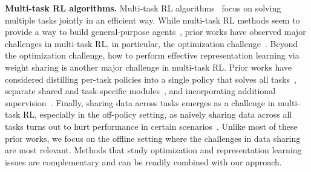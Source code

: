 \textbf{Multi-task RL algorithms.} Multi-task RL algorithms~\citep{wilson2007multi,parisotto2015actor,teh2017distral,espeholt2018impala,hessel2019popart,yu2020gradient, xu2020knowledge, yang2020multi, kalashnikov2021mt,sodhani2021multi}
focus on solving multiple tasks jointly in an efficient way. While multi-task RL methods seem to provide a way to build general-purpose agents~\citep{kalashnikov2021mt}, prior works have observed major challenges in multi-task RL, in particular, the optimization challenge~\citep{hessel2019popart,schaul2019ray,yu2020gradient}.
Beyond the optimization challenge, how to perform effective representation learning via weight sharing is another major challenge in multi-task RL. Prior works have considered distilling per-task policies into a single policy that solves all tasks~\citep{rusu2015policy,teh2017distral,ghosh2017divide,xu2020knowledge}, separate shared and task-specific modules~\citep{d2019sharing}, and incorporating additional supervision~\citep{sodhani2021multi}. Finally, sharing data across tasks emerges as a challenge in multi-task RL, especially in the off-policy setting, as na\"{i}vely sharing data across all tasks turns out to hurt performance in certain scenarios~\citep{kalashnikov2021mt}. Unlike most of these prior works, we focus on the offline setting where the challenges in data sharing are most relevant. Methods that study optimization and representation learning issues are complementary and can be readily combined with our approach.

